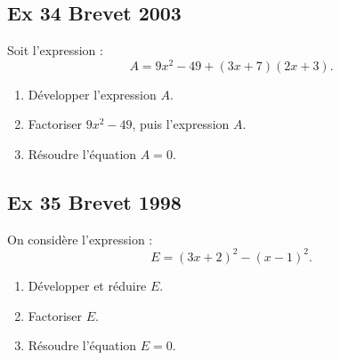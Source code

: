 \documentclass[a4paper,11pt]{article}
\begin{document}
\subsection*{Ex 34 \; Brevet 2003}
Soit l’expression :  
\[
A = 9x^2 - 49 + (3x+7)(2x+3).
\]
\begin{enumerate}
  \item Développer l’expression \(A\).
  \item Factoriser \(9x^2 - 49\), puis l’expression \(A\).
  \item Résoudre l’équation \(A = 0\).
\end{enumerate}

\bigskip

\subsection*{Ex 35 \; Brevet 1998}
On considère l’expression :  
\[
E = (3x+2)^2 - (x-1)^2.
\]
\begin{enumerate}
  \item Développer et réduire \(E\).
  \item Factoriser \(E\).
  \item Résoudre l’équation \(E = 0\).
\end{enumerate}
\end{document}
